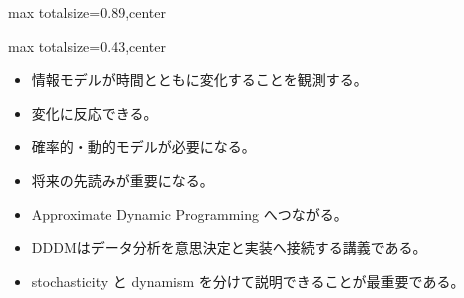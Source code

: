 \begin{minipage}[t]{0.58\textwidth}
\begin{adjustbox}{max totalsize={\textwidth}{0.89\textheight},center}
\begin{minipage}{\textwidth}
\end{minipage}
\end{adjustbox}
\end{minipage}


\clearpage
{}
\begin{minipage}[t]{0.405\textwidth}
\begin{adjustbox}{max totalsize={\textwidth}{0.43\textheight},center}
\begin{minipage}{\textwidth}\scriptsize
{}\begin{itemize}
\item 情報モデルが時間とともに変化することを観測する。
\item 変化に反応できる。
\item 確率的・動的モデルが必要になる。
\item 将来の先読みが重要になる。
\item Approximate Dynamic Programming へつながる。
\end{itemize}\begin{itemize}
\item DDDMはデータ分析を意思決定と実装へ接続する講義である。
\item stochasticity と dynamism を分けて説明できることが最重要である。
\end{itemize}
\end{minipage}
\end{adjustbox}
\end{minipage}\hfill
